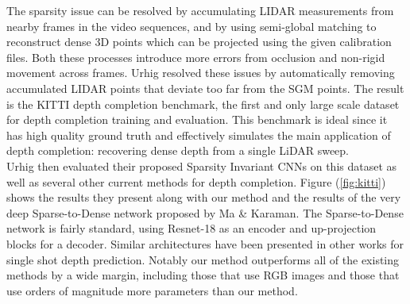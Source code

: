 The sparsity issue can be resolved by accumulating LIDAR measurements from nearby frames in the video sequences, and by using semi-global matching to reconstruct dense 3D points which can be projected using the given calibration files. Both these processes introduce more errors from occlusion and non-rigid movement across frames. Urhig \etal resolved these issues by automatically removing accumulated LIDAR points that deviate too far from the SGM points. The result is the KITTI depth completion benchmark, the first and only large scale dataset for depth completion training and evaluation. This benchmark is ideal since it has high quality ground truth and effectively simulates the main application of depth completion: recovering dense depth from a single LiDAR sweep.\\

Urhig \etal then evaluated their proposed Sparsity Invariant CNNs on this dataset as well as several other current methods for depth completion. Figure (\ref{fig:kitti}) shows the results they present along with our method and the results of the very deep Sparse-to-Dense network proposed by Ma \& Karaman. The Sparse-to-Dense network is fairly standard, using Resnet-18 as an encoder and up-projection blocks for a decoder. Similar architectures have been presented in other works for single shot depth prediction. Notably our method outperforms all of the existing methods by a wide margin, including those that use RGB images and those that use orders of magnitude more parameters than our method.
